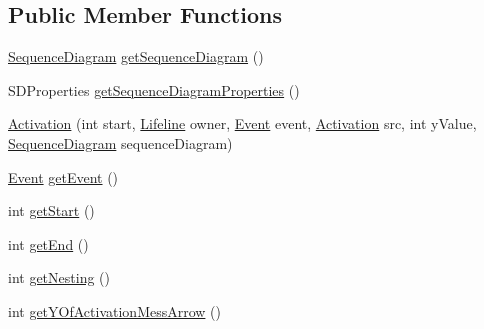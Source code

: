 \subsection*{Public Member Functions}
\begin{DoxyCompactItemize}
\item 
\hyperlink{classorg_1_1tzi_1_1use_1_1gui_1_1views_1_1diagrams_1_1behavior_1_1sequencediagram_1_1_sequence_diagram}{Sequence\-Diagram} \hyperlink{classorg_1_1tzi_1_1use_1_1gui_1_1views_1_1diagrams_1_1behavior_1_1sequencediagram_1_1_activation_a689369bef57debbc24cccbe3540f9966}{get\-Sequence\-Diagram} ()
\item 
S\-D\-Properties \hyperlink{classorg_1_1tzi_1_1use_1_1gui_1_1views_1_1diagrams_1_1behavior_1_1sequencediagram_1_1_activation_ab580a7ace2006b4bf124d847ee99f773}{get\-Sequence\-Diagram\-Properties} ()
\item 
\hyperlink{classorg_1_1tzi_1_1use_1_1gui_1_1views_1_1diagrams_1_1behavior_1_1sequencediagram_1_1_activation_a0df0c7bbcada5b1c44b96294e2ee8a6c}{Activation} (int start, \hyperlink{classorg_1_1tzi_1_1use_1_1gui_1_1views_1_1diagrams_1_1behavior_1_1sequencediagram_1_1_lifeline}{Lifeline} owner, \hyperlink{classorg_1_1tzi_1_1use_1_1uml_1_1sys_1_1events_1_1_event}{Event} event, \hyperlink{classorg_1_1tzi_1_1use_1_1gui_1_1views_1_1diagrams_1_1behavior_1_1sequencediagram_1_1_activation}{Activation} src, int y\-Value, \hyperlink{classorg_1_1tzi_1_1use_1_1gui_1_1views_1_1diagrams_1_1behavior_1_1sequencediagram_1_1_sequence_diagram}{Sequence\-Diagram} sequence\-Diagram)
\item 
\hyperlink{classorg_1_1tzi_1_1use_1_1uml_1_1sys_1_1events_1_1_event}{Event} \hyperlink{classorg_1_1tzi_1_1use_1_1gui_1_1views_1_1diagrams_1_1behavior_1_1sequencediagram_1_1_activation_af93543b8c67a6698e4d9e8c12378a735}{get\-Event} ()
\item 
int \hyperlink{classorg_1_1tzi_1_1use_1_1gui_1_1views_1_1diagrams_1_1behavior_1_1sequencediagram_1_1_activation_ae98c5a6d93dc455278ca113ca0fe5b15}{get\-Start} ()
\item 
int \hyperlink{classorg_1_1tzi_1_1use_1_1gui_1_1views_1_1diagrams_1_1behavior_1_1sequencediagram_1_1_activation_a64633e789adfa953d951c175c00d3a79}{get\-End} ()
\item 
int \hyperlink{classorg_1_1tzi_1_1use_1_1gui_1_1views_1_1diagrams_1_1behavior_1_1sequencediagram_1_1_activation_ad8b9743c90fe5f62cbea158f6cf66db6}{get\-Nesting} ()
\item 
int \hyperlink{classorg_1_1tzi_1_1use_1_1gui_1_1views_1_1diagrams_1_1behavior_1_1sequencediagram_1_1_activation_a5e3744a72d2994a20771a4f6c1587e11}{get\-Y\-Of\-Activation\-Mess\-Arrow} ()

\end{DoxyCompactItemize}
